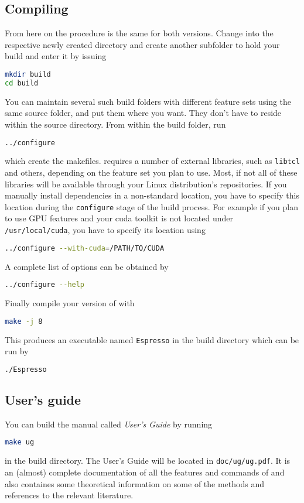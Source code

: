 \documentclass[
paper=a4,                       %
fontsize=11pt,                  %
headinclude=false,              %
footinclude=false,              %
pagesize,                       %
]{scrartcl}
\begin{document}
\subsection{Compiling \es{}}
From here on the procedure is the same for both versions.
Change into the respective newly created \es{} directory and create another subfolder to hold your build and enter it by issuing
\begin{lstlisting}[language=bash]
mkdir build
cd build
\end{lstlisting}
You can maintain several such build folders with different feature sets using the same \es{} source folder,
and put them where you want. They don't have to reside within the source directory.
%
From within the build folder, run
%
\begin{lstlisting}[language=bash]
../configure
\end{lstlisting}

which create the makefiles. \es{} requires a number of external libraries, such as \texttt{libtcl} and others, depending on the feature set you plan to use. Most, if not all of these libraries will be available through your Linux distribution's repositories. If you manually install dependencies in a non-standard location, you have to specify this location during the \texttt{configure} stage of the build process. For example if you plan to use GPU features and your cuda toolkit is not located under \texttt{/usr/local/cuda}, you have to specify its location using
%
\begin{lstlisting}[language=bash]
../configure --with-cuda=/PATH/TO/CUDA
\end{lstlisting}
%
A complete list of options can be obtained by
\begin{lstlisting}[language=bash]
../configure --help
\end{lstlisting}

Finally compile your version of \es{} with
%
\begin{lstlisting}[language=bash]
make -j 8
\end{lstlisting}
%

This produces an executable named \verb!Espresso! in the build directory which can be run by
\begin{lstlisting}[language=bash]
./Espresso
\end{lstlisting}

\subsection{User's guide}
You can build the \es{} manual called \emph{\es{} User's Guide} by running
\begin{lstlisting}[language=bash]
make ug
\end{lstlisting}
in the build directory.
The User's Guide will be located in \texttt{doc/ug/ug.pdf}. It is an (almost) complete documentation of all the features and commands of \es{} and also containes some theoretical information on some of the methods and references to the relevant literature.
\end{document}
